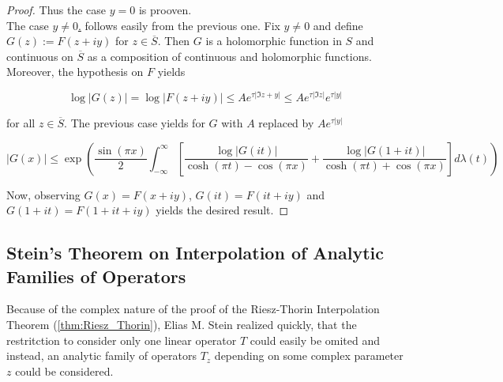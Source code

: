 \begin{proof}
Thus the case $y = 0$ is prooven.\\
The case \underline{$y \neq 0$.} follows easily from the previous one. Fix $y \neq 0$ and define $G(z) := F(z + iy)$ for $z \in \overline{S}$. Then $G$ is a holomorphic function in $S$ and continuous on $\overline{S}$ as a composition of continuous and holomorphic functions. Moreover, the hypothesis on $F$ yields

		\begin{equation}
			\log \vert G(z) \vert = \log \vert F(z + iy) \vert \leqslant Ae^{\tau \vert \Im z + y\vert} \leqslant Ae^{\tau \vert \Im z \vert}e^{\tau \vert y \vert}
		\end{equation}

		for all $z \in \overline{S}$. The previous case yields for $G$ with $A$ replaced by $Ae^{\tau\vert y \vert}$

		\begin{equation}
			\vert G(x) \vert \leqslant \exp\left( \frac{\sin(\pi x)}{2} \int_{-\infty}^\infty \left[ \frac{\log \vert G(it)\vert}{\cosh(\pi t) - \cos(\pi x)} + \frac{\log \vert G(1 + it)\vert}{\cosh(\pi t) + \cos(\pi x)} \right] d\lambda(t)\right)
		\end{equation}

		Now, observing $G(x) = F(x + iy)$, $G(it) = F(it + iy)$ and $G(1 + it) = F(1 + it + iy)$ yields the desired result.
\end{proof}

\subsection{Stein's Theorem on Interpolation of Analytic Families of Operators}
Because of the complex nature of the proof of the Riesz-Thorin Interpolation Theorem (\ref{thm:Riesz_Thorin}), Elias M. Stein realized quickly, that the restritction to consider only one linear operator $T$ could easily be omited and instead, an analytic family of operators $T_z$ depending on some complex parameter $z$ could be considered.

\vspace{2mm}

